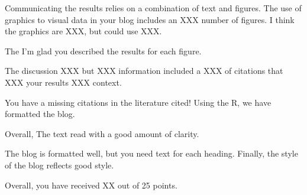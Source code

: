 \documentclass{article}\usepackage[]{graphicx}\usepackage[]{color}
\begin{document}
Communicating the results relies on a combination of text and figures. The use of graphics to visual data in your blog includes an XXX number of figures. I think the graphics are XXX, but could use XXX. 

The I'm glad you described the results for each figure. 


The discussion XXX but XXX information included a XXX of citations that XXX your results XXX context. 

You have a missing citations in the literature cited!  Using the R, we have formatted the blog.

Overall, The text read with a good amount of clarity. 

The blog is formatted well, but you need text for each heading. Finally, the style of the blog reflects good style.

Overall, you have received XX out of 25 points.
\end{document}
